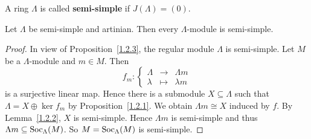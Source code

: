 
\begin{definition}
A ring $\Lambda$ is called \textbf{semi-simple} if $J(\Lambda)=(0)$.
\end{definition}


\begin{lemma}\label{1.2.5}
Let $\Lambda$ be semi-simple and artinian. Then every $\Lambda$-module is semi-simple.
\end{lemma}


\begin{proof}
In view of Proposition~\ref{1.2.3}, the regular module $\Lambda$ is semi-simple. Let $M$ be a $\Lambda$-module and $m\in M$. Then
\[
f_m:
\left\{
\begin{matrix}
\Lambda & \to & \Lambda m \\
\lambda & \mapsto & \lambda m
\end{matrix}
\right.
\]
is a surjective linear map. Hence there is a submodule $X\subseteq \Lambda$ such that $\Lambda = X\oplus \ker f_m$ by Proposition~\ref{1.2.1}. We obtain $\Lambda m \cong X$ induced by $f$. By Lemma~\ref{1.2.2}, $X$ is semi-simple. Hence $\Lambda m$ is semi-simple and thus $\Lambda m \subseteq \operatorname{Soc}_\Lambda(M)$. So $M=\operatorname{Soc}_\Lambda(M)$ is semi-simple. 
\end{proof}

